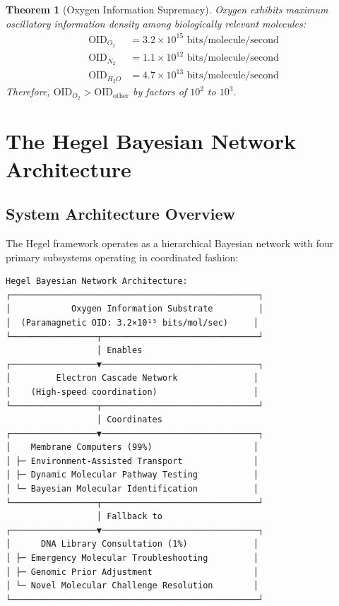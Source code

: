 \documentclass[12pt,a4paper]{article}
\newtheorem{theorem}{Theorem}
\begin{document}
\begin{theorem}[Oxygen Information Supremacy]
Oxygen exhibits maximum oscillatory information density among biologically relevant molecules:
\begin{align}
\text{OID}_{O_2} &= 3.2 \times 10^{15} \text{ bits/molecule/second} \\
\text{OID}_{N_2} &= 1.1 \times 10^{12} \text{ bits/molecule/second} \\
\text{OID}_{H_2O} &= 4.7 \times 10^{13} \text{ bits/molecule/second}
\end{align}
Therefore, $\text{OID}_{O_2} > \text{OID}_{\text{other}}$ by factors of $10^2$ to $10^3$.
\end{theorem}

\section{The Hegel Bayesian Network Architecture}

\subsection{System Architecture Overview}

The Hegel framework operates as a hierarchical Bayesian network with four primary subsystems operating in coordinated fashion:

\begin{verbatim}
Hegel Bayesian Network Architecture:
┌─────────────────────────────────────────────────┐
│            Oxygen Information Substrate         │
│  (Paramagnetic OID: 3.2×10¹⁵ bits/mol/sec)     │
└─────────────────┬───────────────────────────────┘
                  │ Enables
┌─────────────────▼───────────────────────────────┐
│         Electron Cascade Network               │
│    (High-speed coordination)                   │
└─────────────────┬───────────────────────────────┘
                  │ Coordinates
┌─────────────────▼───────────────────────────────┐
│    Membrane Computers (99%)                    │
│ ├─ Environment-Assisted Transport              │
│ ├─ Dynamic Molecular Pathway Testing           │
│ └─ Bayesian Molecular Identification           │
└─────────────────┬───────────────────────────────┘
                  │ Fallback to
┌─────────────────▼───────────────────────────────┐
│      DNA Library Consultation (1%)             │
│ ├─ Emergency Molecular Troubleshooting         │
│ ├─ Genomic Prior Adjustment                    │
│ └─ Novel Molecular Challenge Resolution        │
└─────────────────────────────────────────────────┘
\end{verbatim}
\end{document}
